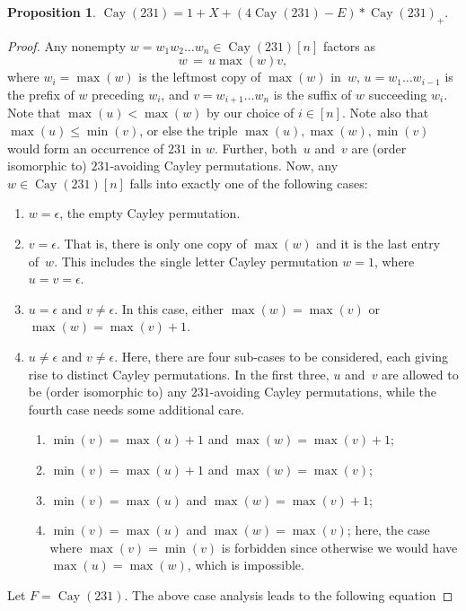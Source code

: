 \documentclass[a4paper, 11pt]{article}
\DeclareMathOperator{\Cay}{Cay}
\theoremstyle{definition}
\newtheorem{proposition}[theorem]{Proposition}
\begin{document}
\begin{proposition}\label{prop: equation for cay231}
  $\Cay(231) = 1 + X + (4\Cay(231) - E)*\Cay(231)_+$.
\end{proposition}
\begin{proof}
Any nonempty $w=w_1w_2\dots w_n\in\Cay(231)[n]$ factors as
$$
w \,=\, u \max(w) v,
$$
where
$w_i=\max(w)$ is the leftmost copy of $\max(w)$ in~$w$,
$u=w_1\ldots w_{i-1}$ is the prefix of $w$ preceding $w_i$, and
$v=w_{i+1}\ldots w_n$ is the suffix of $w$ succeeding $w_i$.
Note that
$\max(u)<\max(w)$ by our choice of $i\in [n]$. Note also that $\max(u)\le \min(v)$, or else
the triple $\max(u),\max(w),\min(v)$ would form an occurrence of $231$ in $w$.
Further, both~$u$ and~$v$ are (order isomorphic to) $231$-avoiding Cayley
permutations. Now, any $w\in\Cay(231)[n]$ falls into exactly one of the
following cases:
\begin{enumerate}
\item $w=\epsilon$, the empty Cayley permutation.
%
\item $v=\epsilon$. That is, there is only one copy of $\max(w)$ and it is
the last entry of~$w$. This includes the single letter Cayley permutation
$w=1$, where $u=v=\epsilon$.
%
\item $u=\epsilon$ and $v\neq \epsilon$. In this case, either
$\max(w)=\max(v)$ or $\max(w)=\max(v)+1$.
%
\item $u\neq\epsilon$ and $v\neq\epsilon$. Here, there are four sub-cases
to be considered, each giving rise to distinct Cayley permutations.
In the first three, $u$ and~$v$ are allowed to be (order isomorphic to)
any $231$-avoiding Cayley permutations, while the fourth case
needs some additional care.
\begin{enumerate}
\item $\min(v)=\max(u)+1$ and $\max(w)=\max(v)+1$;
\item $\min(v)=\max(u)+1$ and $\max(w)=\max(v)$;
\item $\min(v)=\max(u)$ and $\max(w)=\max(v)+1$;
\item $\min(v)=\max(u)$ and $\max(w)=\max(v)$; here, the case where
$\max(v)=\min(v)$ is forbidden since otherwise we would have
$\max(u)=\max(w)$, which is impossible.
\end{enumerate}
\end{enumerate}
Let $F=\Cay(231)$. The above case analysis leads to the following equation

\end{proof}
\end{document}
